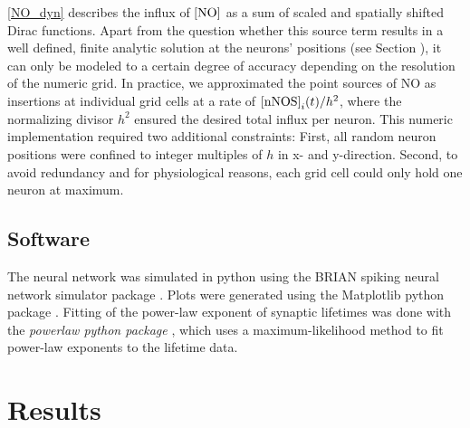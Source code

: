 \documentclass[10pt,letterpaper]{article}
\begin{document}
\eqref{NO_dyn} describes the influx of $\rm [NO]$ as a sum of scaled and spatially shifted Dirac functions. Apart from the question whether this source term results in a well defined, finite analytic solution at the neurons' positions (see Section \textit{}), it can only be modeled to a certain degree of accuracy depending on the resolution of the numeric grid. In practice, we approximated the point sources of NO as insertions at individual grid cells at a rate of ${\rm [nNOS]}_i(t) / h^2$, where the normalizing divisor $h^2$ ensured the desired total influx per neuron. This numeric implementation required two additional constraints: First, all random neuron positions were confined to integer multiples of $h$ in x- and y-direction. Second, to avoid redundancy and for physiological reasons, each grid cell could only hold one neuron at maximum.

\subsection*{Software}
The neural network was simulated in python using the BRIAN spiking neural network simulator package \cite{Briansim}. Plots were generated using the Matplotlib python package \cite{Matplotlib}. Fitting of the power-law exponent of synaptic lifetimes was done with the \textit{powerlaw python package} \cite{Powerlaw_Package}, which uses a maximum-likelihood method to fit power-law exponents to the lifetime data.

\section*{Results}
\end{document}

